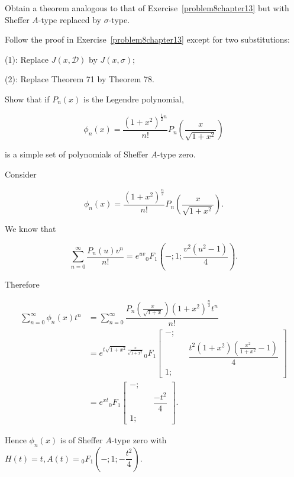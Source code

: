 \begin{problem}\label{problem9chapter13}
Obtain a theorem analogous to that of Exercise~\ref{problem8chapter13} but with Sheffer $A$-type replaced by $\sigma$-type.
\end{problem}
\begin{solution}
Follow the proof in Exercise~\ref{problem8chapter13} except for two substitutions:

(1): Replace $J(x,\mathscr{D})$ by $J(x,\sigma)$;

(2): Replace Theorem 71 by Theorem 78.
\end{solution}
\begin{problem}\label{problem10chapter13}
Show that if $P_n(x)$ is the Legendre polynomial,

$$\phi_n(x) = \dfrac{(1+x^2)^{\frac{1}{2}n}}{n!} P_n \left( \dfrac{x}{\sqrt{1+x^2}} \right)$$

is a simple set of polynomials of Sheffer $A$-type zero.
\end{problem}
\begin{solution}
Consider

$$\phi_n(x) = \dfrac{(1+x^2)^{\frac{n}{2}}}{n!} P_n \left( \dfrac{x}{\sqrt{1+x^2}} \right).$$

We know that

$$\displaystyle\sum_{n=0}^{\infty} \dfrac{P_n(u) v^n}{n!} = e^{uv} {}_0F_1 \left( -;1;\dfrac{v^2(u^2-1)}{4} \right).$$

Therefore

$$\begin{array}{ll}
\displaystyle\sum_{n=0}^{\infty} \phi_n(x) t^n &= \displaystyle\sum_{n=0}^{\infty} \dfrac{P_n \left( \frac{x}{\sqrt{1+x}} \right)(1+x^2)^{\frac{n}{2}}t^n}{n!}\\
&= e^{t \sqrt{1+x^2} \frac{x}{\sqrt{1+x^2}}} {}_0F_1 \left[ \begin{array}{rlr}
-; & & \\
& & \dfrac{t^2(1+x^2) \left( \frac{x^2}{1+x^2}-1 \right)}{4} \\
1; & & 
\end{array} \right] \\
&= e^{xt} {}_0F_1 \left[ \begin{array}{rlr}
-; & & \\
& & \dfrac{-t^2}{4} \\
1; & & 
\end{array} \right].
\end{array}$$

Hence $\phi_n(x)$ is of Sheffer $A$-type zero with $H(t) = t, A(t) = {}_0F_1 \left(-;1; -\dfrac{t^2}{4} \right).$
\end{solution}
